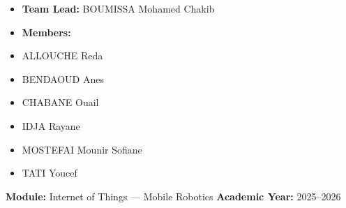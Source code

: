 \begin{titlepage}
\begin{flushleft}
    \raggedright
      \begin{tcolorbox}[width=\linewidth, colframe=black, colback=white, boxsep=1mm, arc=2mm, left=2mm]
        \begin{itemize}
            \item[] \textbf{Team Lead:} BOUMISSA Mohamed Chakib
            \item[] \textbf{Members:}
            \item[] \quad ALLOUCHE Reda
            \item[] \quad BENDAOUD Anes
            \item[] \quad CHABANE Ouail
            \item[] \quad IDJA Rayane
            \item[] \quad MOSTEFAI Mounir Sofiane
            \item[] \quad TATI Youcef
        \end{itemize}
    \end{tcolorbox}
\end{flushleft}

\vspace{-0.5cm}
\begin{center}
	\textbf{Module:} Internet of Things --- Mobile Robotics \hspace{1cm}
	\textbf{Academic Year:} 2025--2026
\end{center}

\end{titlepage}
\restoregeometry

